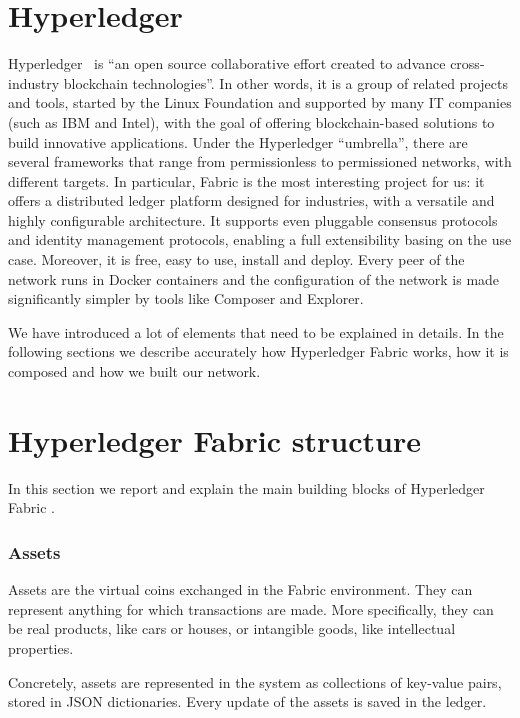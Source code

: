 \section{Hyperledger}
\label{sec:hyperledger}
Hyperledger~\cite{hyperledger} is ``an open source collaborative effort created to advance cross-industry blockchain technologies''. In other words, it is a group of related projects and tools, started by the Linux Foundation and supported by many IT companies (such as IBM and Intel), with the goal of offering blockchain-based solutions to build innovative applications. Under the Hyperledger ``umbrella'', there are several frameworks that range from permissionless to permissioned networks, with different targets. In particular, Fabric is the most interesting project for us: it offers a distributed ledger platform designed for industries, with a versatile and highly configurable architecture. It supports even pluggable consensus protocols and identity management protocols, enabling a full extensibility basing on the use case. Moreover, it is free, easy to use, install and deploy. Every peer of the network runs in Docker containers and the configuration of the network is made significantly simpler by tools like Composer and Explorer.

We have introduced a lot of elements that need to be explained in details. In the following sections we describe accurately how Hyperledger Fabric works, how it is composed and how we built our network.

\section{Hyperledger Fabric structure}
\label{sec:fabric_structure}
In this section we report and explain the main building blocks of Hyperledger Fabric \cite{hyperledger_paper}.

\subsubsection{Assets}
Assets are the virtual coins exchanged in the Fabric environment. They can represent anything for which transactions are made. More specifically, they can be real products, like cars or houses, or intangible goods, like intellectual properties.

Concretely, assets are represented in the system as collections of key-value pairs, stored in JSON dictionaries. Every update of the assets is saved in the ledger.

